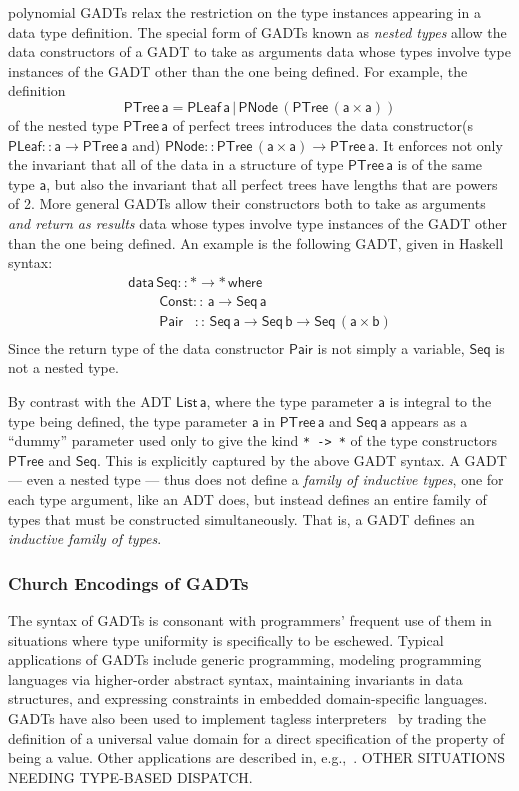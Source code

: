 \documentclass[acmsmall,screen,review,anonymous]{acmart}
\theoremstyle{definition}
\begin{document}
{\color{blue} polynomial} GADTs relax the restriction on the type
instances appearing in a data type definition. The special form of
GADTs known as {\em nested types} allow the data constructors of a
GADT to take as arguments data whose types involve type instances of
the GADT other than the one being defined. For example, the 
definition 
\[\mathsf{PTree \, a = PLeaf \,a \,|\, PNode \,(PTree\,(a \times
  a))}\] of the nested type $\mathsf{PTree\,a}$ of perfect trees
introduces the data constructor(s $\mathsf{PLeaf :: a \to PTree\,a}$
and) $\mathsf{PNode :: PTree \,(a\times a) \to PTree\,a}$. It enforces
not only the invariant that all of the data in a structure of type
$\mathsf{PTree\,a}$ is of the same type $\mathsf{a}$, but also the
invariant that all perfect trees have lengths that are powers of
2. More general GADTs allow their constructors both to take as
arguments {\em and return as results} data whose types involve type
instances of the GADT other than the one being defined. An example is
the following GADT, given in Haskell syntax:
\[\begin{array}{l}
\mathsf{data\, Seq :: * \to *\,where}\\
\mathsf{\;\;\;\;\;\;\;\;Const ::\, a \to Seq\,a}\\
\mathsf{\;\;\;\;\;\;\;\;Pair\,\,\,\,\, ::\, Seq \,a \to Seq\,b \to
  Seq\,(a \times b)}\\ 
\end{array}\]
Since the return type of the data constructor $\mathsf{Pair}$ is not
simply a variable, $\mathsf{Seq}$ is not a nested type.

By contrast with the ADT $\mathsf{List\, a}$, where the type parameter
$\mathsf{a}$ is integral to the type being defined, the type parameter
$\mathsf{a}$ in $\mathsf{PTree\,a}$ and $\mathsf{Seq\,a}$ appears as a
``dummy'' parameter used only to give the kind \verb|* -> *| of the
type constructors $\mathsf{PTree}$ and $\mathsf{Seq}$. This is
explicitly captured by the above GADT syntax. A GADT --- even a nested
type --- thus does not define a {\em family of inductive types}, one
for each type argument, like an ADT does, but instead defines an
entire family of types that must be constructed simultaneously. That
is, a GADT defines an {\em inductive family of types}.

\subsubsection{Church Encodings of GADTs}

The syntax of GADTs is consonant with programmers' frequent use of
them in situations where type uniformity is specifically to be
eschewed.  {\color{blue} Typical applications of GADTs include generic
  programming, modeling programming languages via higher-order
  abstract syntax, maintaining invariants in data structures, and
  expressing constraints in embedded domain-specific languages. GADTs
  have also been used to implement tagless
  interpreters~\cite{pl04,pr06,pvww06} by trading the definition of a
  universal value domain for a direct specification of the property of
  being a value. Other applications are described in,
  e.g.,~\cite{js15,rou06,MORE,UPDATED}. OTHER SITUATIONS NEEDING
  TYPE-BASED DISPATCH.}
\end{document}
